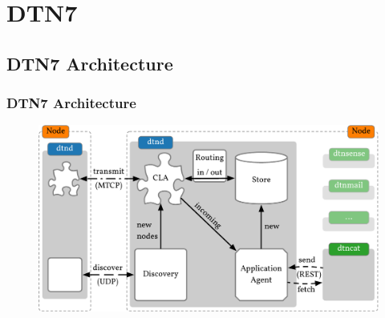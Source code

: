 \section{DTN7}

\subsection{DTN7 Architecture}

\begin{frame}
  \frametitle{DTN7 Architecture}

  \begin{figure}
    \includegraphics[width=\linewidth,keepaspectratio]{include/dtn7-architecture}
  \end{figure}
\end{frame}
